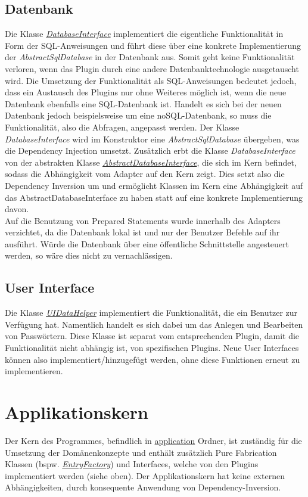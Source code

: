 \subsection{Datenbank}
Die Klasse \href{https://github.com/moorts/Morik/blob/main/src/adapters/database/DatabaseInterface.h}{\textit{DatabaseInterface}} implementiert die eigentliche Funktionalität in Form der SQL-Anweisungen und führt diese über eine konkrete Implementierung der \textit{AbstractSqlDatabase} in der Datenbank aus. Somit geht keine Funktionalität verloren, wenn das Plugin durch eine andere Datenbanktechnologie ausgetauscht wird. Die Umsetzung der Funktionalität als SQL-Anweisungen bedeutet jedoch, dass ein Austausch des Plugins nur ohne Weiteres möglich ist, wenn die neue Datenbank ebenfalls eine SQL-Datenbank ist. Handelt es sich bei der neuen Datenbank jedoch beispielsweise um eine noSQL-Datenbank, so muss die Funktionalität, also die Abfragen, angepasst werden. Der Klasse \textit{DatabaseInterface} wird im Konstruktor eine \textit{AbstractSqlDatabase} übergeben, was die Dependency Injection umsetzt. Zusätzlich erbt die Klasse \textit{DatabaseInterface} von der abstrakten Klasse \href{https://github.com/moorts/Morik/blob/main/src/application/AbstractDatabaseInterface.h}{\textit{AbstractDatabaseInterface}}, die sich im Kern befindet, sodass die Abhängigkeit vom Adapter auf den Kern zeigt. Dies setzt also die Dependency Inversion um und ermöglicht Klassen im Kern eine Abhängigkeit auf das AbstractDatabaseInterface zu haben statt auf eine konkrete Implementierung davon.\\
Auf die Benutzung von Prepared Statements wurde innerhalb des Adapters verzichtet, da die Datenbank lokal ist und nur der Benutzer Befehle auf ihr ausführt. Würde die Datenbank über eine öffentliche Schnittstelle angesteuert werden, so wäre dies nicht zu vernachlässigen.

\subsection{User Interface}

Die Klasse \href{TODO:ENTER LINK AFTER MERGE}{\textit{UIDataHelper}} implementiert die Funktionalität, die ein Benutzer zur Verfügung hat. Namentlich handelt es sich dabei um das Anlegen und Bearbeiten von Passwörtern. Diese Klasse ist separat vom entsprechenden Plugin, damit die Funktionalität nicht abhängig ist, von spezifischen Plugins. Neue User Interfaces können also implementiert/hinzugefügt werden, ohne diese Funktionen erneut zu implementieren.

\section{Applikationskern}

Der Kern des Programmes, befindlich in \href{https://github.com/moorts/Morik/tree/main/src/application}{application} Ordner, ist zuständig für die Umsetzung der Domänenkonzepte und enthält zusätzlich Pure Fabrication Klassen (bspw. \href{https://github.com/moorts/Morik/blob/main/src/application/EntryFactory.h}{\textit{EntryFactory}}) und Interfaces, welche von den Plugins implementiert werden (siehe oben). Der Applikationskern hat keine externen Abhängigkeiten, durch konsequente Anwendung von Dependency-Inversion. 
